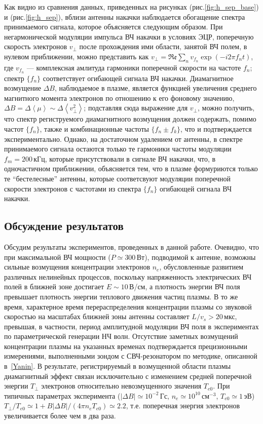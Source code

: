 \documentclass[autoref,10pt]{disser}
\begin{document}
Как видно из сравнения данных, приведенных на рисунках (\mbox{рис.\ref{fig:h_sep_base}}) и (\mbox{рис.\ref{fig:h_sep}}), вблизи антенны накачки наблюдается обогащение спектра принимаемого сигнала, которое объясняется следующим образом. При негармонической модуляции импульса ВЧ накачки в условиях ЭЦР, поперечную скорость электронов $v_\perp$ после прохождения ими области, занятой ВЧ полем, в нулевом приближении, можно представить как $v_\perp=\mathfrak{Re}\sum_{n} v_{f_n}\exp(-i2\pi{}f_nt)$, где $v_{f_n}$ --- комплексная амлитуда гармоники поперечной скорости на частоте $f_n$; спектр $\{f_n\}$ соответствует огибающей сигнала ВЧ накачки. Диамагнитное возмущение $\Delta{}B$, наблюдаемое в плазме, является функцией увеличения среднего магнитного момента электронов по отношению к его фоновому значению, $\Delta{}B=\Delta\left<\mu\right>\sim{}\Delta{}\left<v_\perp^2\right>$; подставляя сюда выражение для $v_\perp$, можно получить, что спектр региструемого диамагнитного возмущения должен содержать, помимо частот $\{f_n\}$, также и комбинационные частоты $\{f_n\pm{}f_k\}$, что и подтверждается экспериментально. Однако, на достаточном удалением от антенны, в спектре принимаемого сигнала остаются только те гармоники частоты модуляции $f_m=200$\,кГц, которые присутствовали в сигнале ВЧ накачки, что, в одночастичном приближении, объясняется тем, что в плазме формуриются только те ``бестелесные'' антенны, которые соответсвуют модуляции поперечной скорости электронов с частотами из спектра  $\{f_n\}$ огибающей сигнала ВЧ накачки.
\subsection{Обсуждение результатов}
Обсудим результаты экспериментов, проведенных в данной работе. Очевидно, что при максимальной ВЧ мощности ($P\simeq300$\,Вт), подводимой к антенне, возможны сильные возмущения концентрации электронов $n_e$, обусловленные развитием различных нелинейных процессов, поскольку напряженность электрических ВЧ полей в ближней зоне достигает $E\sim 10$\,В/см, а плотность энергии ВЧ поля превышает плотность энергии теплового движения частиц плазмы. В то же время, характерное время перераспределения концентрации плазмы со звуковой скоростью на масштабах ближней зоны антенны составляет $L/v_s >20$\,мкс, превышая, в частности, период амплитудной модуляции ВЧ поля в экспериментах по параметрической генерации НЧ волн. Отсутствие заметных возмущений концентрации плазмы на указанных временах подтверждается прецизионными измерениями, выполненными зондом с СВЧ-резонатором по методике, описанной в~\ref{Yanin}. В результате, регистрируемый в возмущенной области плазмы диамагнитный эффект связан исключительно с изменением средней поперечной энергии $T_{\perp}$ электронов относительно невозмущенного значения $T_{e0}$. При типичных параметрах эксперимента ($|\Delta B|\simeq 10^{-2}$\,Гс, $n_e\simeq 10^{10}$\,см$^{-3}$, $T_{e0}\simeq 1$\,эВ) $T_{\perp}/T_{e0} \simeq 1 + B|\Delta B|/(4\pi n_{e}T_{e0}) \simeq 2.2$, т.е. поперечная энергия электронов увеличивается более чем в два раза.
\end{document}

